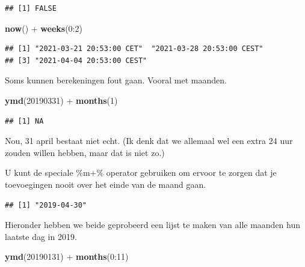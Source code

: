 \documentclass[]{tufte-book}
\newenvironment{Shaded}{}{}
\newcommand{\DecValTok}[1]{\textcolor[rgb]{0.25,0.63,0.44}{#1}}
\newcommand{\KeywordTok}[1]{\textcolor[rgb]{0.00,0.44,0.13}{\textbf{#1}}}
\newcommand{\NormalTok}[1]{#1}
\newcommand{\OperatorTok}[1]{\textcolor[rgb]{0.40,0.40,0.40}{#1}}
\newcommand{\StringTok}[1]{\textcolor[rgb]{0.25,0.44,0.63}{#1}}
\begin{document}
\begin{verbatim}
## [1] FALSE
\end{verbatim}

\begin{Shaded}
\begin{Highlighting}[]
\KeywordTok{now}\NormalTok{() }\OperatorTok{+}\StringTok{ }\KeywordTok{weeks}\NormalTok{(}\DecValTok{0}\OperatorTok{:}\DecValTok{2}\NormalTok{)}
\end{Highlighting}
\end{Shaded}

\begin{verbatim}
## [1] "2021-03-21 20:53:00 CET"  "2021-03-28 20:53:00 CEST"
## [3] "2021-04-04 20:53:00 CEST"
\end{verbatim}

Soms kunnen berekeningen fout gaan. Vooral met maanden.

\begin{Shaded}
\begin{Highlighting}[]
\KeywordTok{ymd}\NormalTok{(}\DecValTok{20190331}\NormalTok{) }\OperatorTok{+}\StringTok{ }\KeywordTok{months}\NormalTok{(}\DecValTok{1}\NormalTok{)}
\end{Highlighting}
\end{Shaded}

\begin{verbatim}
## [1] NA
\end{verbatim}

Nou, 31 april bestaat niet echt. (Ik denk dat we allemaal wel een extra 24 uur zouden willen hebben, maar dat is niet zo.)

U kunt de speciale \%m+\% operator gebruiken om ervoor te zorgen dat je toevoegingen nooit over het einde van de maand gaan.

\begin{Shaded}
\end{Shaded}

\begin{verbatim}
## [1] "2019-04-30"
\end{verbatim}

Hieronder hebben we beide geprobeerd een lijst te maken van alle maanden hun laatste dag in 2019.

\begin{Shaded}
\begin{Highlighting}[]
\KeywordTok{ymd}\NormalTok{(}\DecValTok{20190131}\NormalTok{) }\OperatorTok{+}\StringTok{ }\KeywordTok{months}\NormalTok{(}\DecValTok{0}\OperatorTok{:}\DecValTok{11}\NormalTok{)}
\end{Highlighting}
\end{Shaded}
\end{document}
